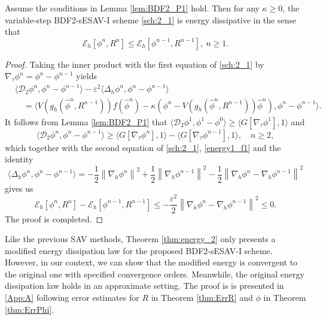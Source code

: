 \documentclass{m2an}
\newcommand{\md}{\mathcal{D}}
\begin{document}
\begin{thrm}\label{thm:energy_2} 
	Assume the conditions in Lemma \ref{lem:BDF2_P1} hold. Then for any $\kappa \geq 0$, the variable-step BDF2-sESAV-I scheme \eqref{sch:2_1} is energy dissipative in the sense that 
	\begin{equation}\label{dis_energy:e1}
		\mathcal{E}_h[\phi^{n}, R^{n}] \leq \mathcal{E}_h[\phi^{n-1}, R^{n-1}], ~n \ge 1.
	\end{equation}
\end{thrm}
\begin{proof}
	Taking the inner product with the first equation of \eqref{sch:2_1} by $\nabla_{\tau} \phi^{n} = \phi^{n}-\phi^{n-1}$ yields
	\begin{equation}\label{energy1_f1}
		\begin{aligned}
			& \big\langle \md_{2} \phi^{n}, \phi^{n}-\phi^{n-1} \big\rangle - \varepsilon^2 \big\langle\Delta_h \phi^{n}, \phi^{n}-\phi^{n-1}\big\rangle \\
			& \quad = \big\langle V ( g_h(\hat{\phi}^{n}, R^{n-1}) ) f(\hat{\phi}^{n}) - \kappa ( \phi^{n} - V ( g_h(\hat{\phi}^{n}, R^{n-1}) ) \hat{\phi}^{n} ), \phi^{n}-\phi^{n-1} \big\rangle.
		\end{aligned}
	\end{equation}
	It follows from Lemma \ref{lem:BDF2_P1} that $ \big\langle \md_{2} \phi^{1} , \phi^{1}-\phi^{0} \big\rangle \geq \langle G[ \nabla_{\tau} \phi^{1} ], 1 \rangle $ and
	$$
	\big\langle \md_{2} \phi^{n} , \phi^{n}-\phi^{n-1} \big\rangle \geq \langle G[ \nabla_{\tau} \phi^{n} ], 1 \rangle - \langle G[ \nabla_{\tau}  \phi^{n-1} ], 1 \rangle, \quad  n \geq 2,
	$$
	which together with the second equation of \eqref{sch:2_1}, \eqref{energy1_f1} and the identity
	$$
	\big\langle\Delta_h \phi^{n}, \phi^{n}-\phi^{n-1}\big\rangle=  -\frac{1}{2}\left\|\nabla_h \phi^{n}\right\|^2 + \frac{1}{2}\left\|\nabla_h \phi^{n-1}\right\|^2 -\frac{1}{2}\left\|\nabla_h \phi^{n}-\nabla_h \phi^{n-1}\right\|^2
	$$
	gives us
	$$
	\mathcal{E}_h[\phi^{n}, R^{n}]-\mathcal{E}_h[\phi^{n-1}, R^{n-1}] \leq  -\frac{\varepsilon^2}{2}\left\|\nabla_h \phi^{n}-\nabla_h \phi^{n-1}\right\|^2 \leq 0.
	$$
	The proof is completed.
\end{proof}
Like the previous SAV methods, Theorem \ref{thm:energy_2} only presents a modified energy dissipation law for the proposed BDF2-sESAV-I scheme. %
However, in our context,  we can show that the modified  energy is convergent to the original one with specified convergence orders. Meanwhile, the original energy dissipation law holds in an approximate setting. The proof is is presented in \ref{App:A} following  error estimates for $R$ in Theorem \ref{thm:ErrR} and $\phi$ in Theorem \ref{thm:ErrPhi}.
\end{document}
